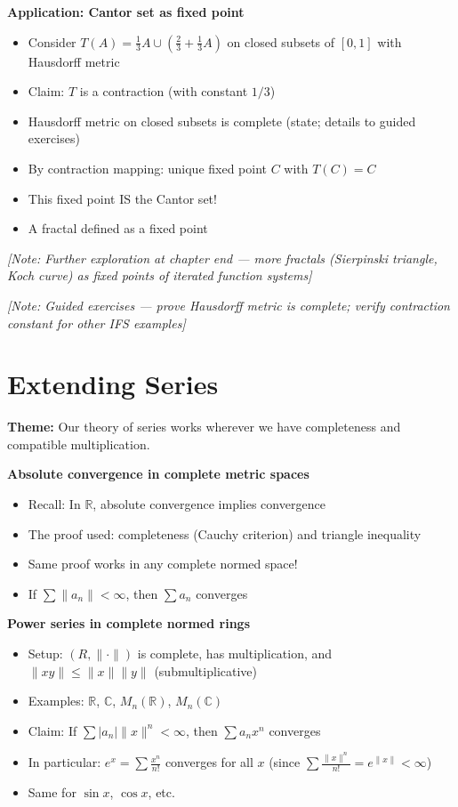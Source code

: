 \documentclass[
  10pt,
  letterpaper,
]{scrbook}
\providecommand{\tightlist}{%
  \setlength{\itemsep}{0pt}\setlength{\parskip}{0pt}}
\begin{document}
\textbf{Application: Cantor set as fixed point}

\begin{itemize}
\tightlist
\item
  Consider \(T(A) = \frac{1}{3}A \cup (\frac{2}{3} + \frac{1}{3}A)\) on
  closed subsets of \([0,1]\) with Hausdorff metric
\item
  Claim: \(T\) is a contraction (with constant \(1/3\))
\item
  Hausdorff metric on closed subsets is complete (state; details to
  guided exercises)
\item
  By contraction mapping: unique fixed point \(C\) with \(T(C) = C\)
\item
  This fixed point IS the Cantor set!
\item
  A fractal defined as a fixed point
\end{itemize}

\emph{{[}Note: Further exploration at chapter end --- more fractals
(Sierpinski triangle, Koch curve) as fixed points of iterated function
systems{]}}

\emph{{[}Note: Guided exercises --- prove Hausdorff metric is complete;
verify contraction constant for other IFS examples{]}}

\section{Extending Series}\label{extending-series}

\textbf{Theme:} Our theory of series works wherever we have completeness
and compatible multiplication.

\textbf{Absolute convergence in complete metric spaces}

\begin{itemize}
\tightlist
\item
  Recall: In \(\mathbb{R}\), absolute convergence implies convergence
\item
  The proof used: completeness (Cauchy criterion) and triangle
  inequality
\item
  Same proof works in any complete normed space!
\item
  If \(\sum \|a_n\| < \infty\), then \(\sum a_n\) converges
\end{itemize}

\textbf{Power series in complete normed rings}

\begin{itemize}
\tightlist
\item
  Setup: \((R, \|\cdot\|)\) is complete, has multiplication, and
  \(\|xy\| \leq \|x\|\|y\|\) (submultiplicative)
\item
  Examples: \(\mathbb{R}\), \(\mathbb{C}\), \(M_n(\mathbb{R})\),
  \(M_n(\mathbb{C})\)
\item
  Claim: If \(\sum |a_n| \|x\|^n < \infty\), then \(\sum a_n x^n\)
  converges
\item
  In particular: \(e^x = \sum \frac{x^n}{n!}\) converges for all \(x\)
  (since \(\sum \frac{\|x\|^n}{n!} = e^{\|x\|} < \infty\))
\item
  Same for \(\sin x\), \(\cos x\), etc.
\end{itemize}
\end{document}
